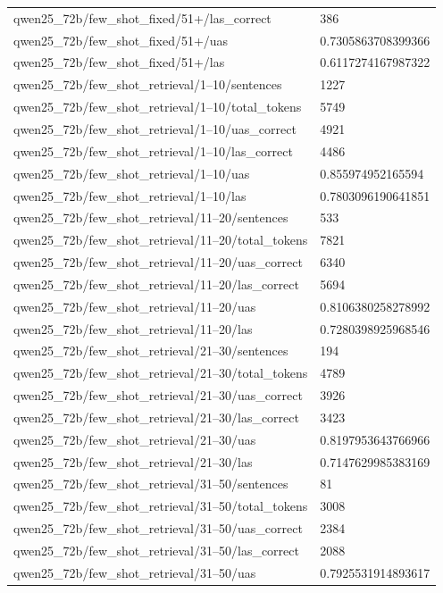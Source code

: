 \begin{tabular}{ll}
qwen25\_72b/few\_shot\_fixed/51+/las\_correct & 386 \\
qwen25\_72b/few\_shot\_fixed/51+/uas & 0.7305863708399366 \\
qwen25\_72b/few\_shot\_fixed/51+/las & 0.6117274167987322 \\
qwen25\_72b/few\_shot\_retrieval/1–10/sentences & 1227 \\
qwen25\_72b/few\_shot\_retrieval/1–10/total\_tokens & 5749 \\
qwen25\_72b/few\_shot\_retrieval/1–10/uas\_correct & 4921 \\
qwen25\_72b/few\_shot\_retrieval/1–10/las\_correct & 4486 \\
qwen25\_72b/few\_shot\_retrieval/1–10/uas & 0.855974952165594 \\
qwen25\_72b/few\_shot\_retrieval/1–10/las & 0.7803096190641851 \\
qwen25\_72b/few\_shot\_retrieval/11–20/sentences & 533 \\
qwen25\_72b/few\_shot\_retrieval/11–20/total\_tokens & 7821 \\
qwen25\_72b/few\_shot\_retrieval/11–20/uas\_correct & 6340 \\
qwen25\_72b/few\_shot\_retrieval/11–20/las\_correct & 5694 \\
qwen25\_72b/few\_shot\_retrieval/11–20/uas & 0.8106380258278992 \\
qwen25\_72b/few\_shot\_retrieval/11–20/las & 0.7280398925968546 \\
qwen25\_72b/few\_shot\_retrieval/21–30/sentences & 194 \\
qwen25\_72b/few\_shot\_retrieval/21–30/total\_tokens & 4789 \\
qwen25\_72b/few\_shot\_retrieval/21–30/uas\_correct & 3926 \\
qwen25\_72b/few\_shot\_retrieval/21–30/las\_correct & 3423 \\
qwen25\_72b/few\_shot\_retrieval/21–30/uas & 0.8197953643766966 \\
qwen25\_72b/few\_shot\_retrieval/21–30/las & 0.7147629985383169 \\
qwen25\_72b/few\_shot\_retrieval/31–50/sentences & 81 \\
qwen25\_72b/few\_shot\_retrieval/31–50/total\_tokens & 3008 \\
qwen25\_72b/few\_shot\_retrieval/31–50/uas\_correct & 2384 \\
qwen25\_72b/few\_shot\_retrieval/31–50/las\_correct & 2088 \\
qwen25\_72b/few\_shot\_retrieval/31–50/uas & 0.7925531914893617 \\

\end{tabular}
